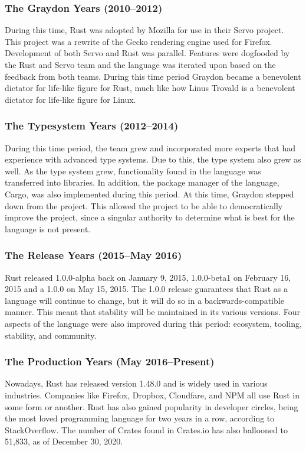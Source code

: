 \documentclass{article}
\begin{document}
  \subsubsection{The Graydon Years (2010--2012)}
  During this time, Rust was adopted by Mozilla for use in their Servo project.
  This project was a rewrite of the Gecko rendering engine used for Firefox.
  Development of both Servo and Rust was parallel. Features were dogfooded by
  the Rust and Servo team and the language was iterated upon based on the
  feedback from both teams. During this time period Graydon became a benevolent
  dictator for life-like figure for Rust, much like how Linus Trovald is a
  benevolent dictator for life-like figure for Linux.

  \subsubsection{The Typesystem Years (2012--2014)}
  During this time period, the team grew and incorporated more experts that had
  experience with advanced type systems. Due to this, the type system also grew
  as well. As the type system grew, functionality found in the language was
  transferred into libraries. In addition, the package manager of the language,
  Cargo, was also implemented during this period. At this time, Graydon stepped
  down from the project. This allowed the project to be able to democratically
  improve the project, since a singular authority to determine what is best for
  the language is not present.

  \subsubsection{The Release Years (2015--May 2016)}
  Rust released 1.0.0-alpha back on January 9, 2015, 1.0.0-beta1 on February 16,
  2015 and a 1.0.0 on May 15, 2015. The 1.0.0 release guarantees that Rust as a
  language will continue to change, but it will do so in a backwards-compatible
  manner. This meant that stability will be maintained in its various versions.
  Four aspects of the language were also improved during this period: ecosystem,
  tooling, stability, and community.

  \subsubsection{The Production Years (May 2016--Present)}
  Nowadays, Rust has released version 1.48.0 and is widely used in various
  industries. Companies like Firefox, Dropbox, Cloudfare, and NPM all use Rust
  in some form or another. Rust has also gained popularity in developer circles,
  being the most loved programming language for two years in a row, according to
  StackOverflow. The number of Crates found in Crates.io has also ballooned to
  51,833, as of December 30, 2020.
\end{document}
